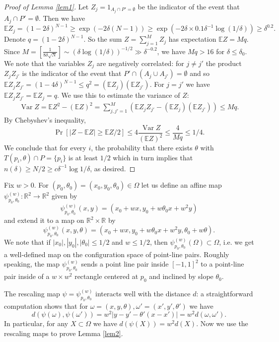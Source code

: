 \documentclass[11pt,letterpaper]{amsart}
\renewcommand{\le}{\leqslant}
\renewcommand{\ge}{\geqslant}
\def\R{\mathbb R}
\def\E{\mathbb E}
\def\d{\delta}
\begin{document}
\begin{proof}[Proof of Lemma \ref{lem1}]
    
    
    Let $Z_j = 1_{A_j \cap P' = \emptyset}$ be the indicator of the event that $A_j \cap P' = \emptyset$. Then we have 
    \[
    \E Z_j = (1-2\d)^{N-1} \ge \exp(- 2\d (N-1)) \ge \exp(-2\d \times 0.1\d^{-1} \log (1/\d)) \ge \d^{0.2}.
    \]
    Denote $q = (1-2\d)^{N-1}$. So the sum $Z= \sum_{j=1}^M Z_j$ has expectation $\E Z =M q$. Since $M = [\frac{1}{8\d\sqrt{N}}] \sim (\d \log(1/\d))^{-1/2} \gg \d^{-0.2}$, we have $Mq > 16$ for $\d \le \d_0$. We note that the variables $Z_j$ are negatively correlated: for $j\neq j'$ the product $Z_{j} Z_{j'}$ is the indicator of the event that $P' \cap (A_{j}\cup A_{j'}) = \emptyset$ and so $\E Z_j Z_{j'} = (1-4\d)^{N-1} \le q^2 = (\E Z_j) (\E Z_{j'})$. For $j=j'$ we have $\E Z_jZ_{j'} = \E Z_j = q$. 
    We use this to estimate the variance of $Z$:
    \begin{align*}
    \operatorname{Var}Z = \E Z^2 - (\E Z)^2= \sum_{j, j'=1}^M \left(\E Z_j Z_{j'}- (\E Z_j)(\E Z_{j'}) \right)\le  M q.
    \end{align*}
    By Chebyshev's inequality,
    \[
    \Pr[ |Z -\E Z| \ge \E Z/2] \le 4\frac{\operatorname{Var}Z}{(\E Z)^2} \le \frac{4}{M q} \le 1/4.
    \]
    We conclude that for every $i$, the probability that there exists $\theta$ with $T(p_i, \theta)\cap P=\{p_i\}$ is at least $1/2$ which in turn implies that $n(\d) \ge N/2 \ge c\d^{-1}\log 1/\d$, as desired.
\end{proof}

Fix $w>0$. For $(p_0, \theta_0)=(x_0,y_0, \theta_0)\in \Omega$ let us define an affine map $\psi^{(w)}_{p_0, \theta_0}: \R^2\to \R^2$ given by
\[
\psi^{(w)}_{p_0, \theta_0}(x, y) = (x_0 + w x, y_0 + w\theta_0 x + w^2 y)
\]
and extend it to a map on $\R^2\times \R$ by
\[
\psi^{(w)}_{p_0, \theta_0}(x, y, \theta) = (x_0 + w x, y_0 + w\theta_0 x + w^2 y, \theta_0 + w \theta).
\]
We note that if $|x_0|, |y_0|, |\theta_0| \le 1/2$ and $w\le 1/2$, then $\psi^{(w)}_{p_0, \theta_0}(\Omega) \subset \Omega$, i.e. we get a well-defined map on the configuration space of point-line pairs. Roughly speaking, the map $\psi^{(w)}_{p_0, \theta_0}$ sends a point line pair inside $[-1,1]^2$ to a point-line pair inside of a $w\times w^2$ rectangle centered at $p_0$ and inclined by slope $\theta_0$. 

The rescaling map $\psi=\psi^{(w)}_{p_0,\theta_0}$ interacts well with the distance $d$: a straightforward computation shows that for $\omega = (x,y, \theta), \omega'=(x',y',\theta')$ we have
\[
d(\psi(\omega), \psi(\omega')) = w^2 |y - y' - \theta'(x-x')| = w^2 d(\omega,\omega').
\]
In particular, for any $X \subset \Omega$ we have $d(\psi(X)) = w^2 d(X)$. Now we use the rescaling maps to prove Lemma \ref{lem2}.
\end{document}

